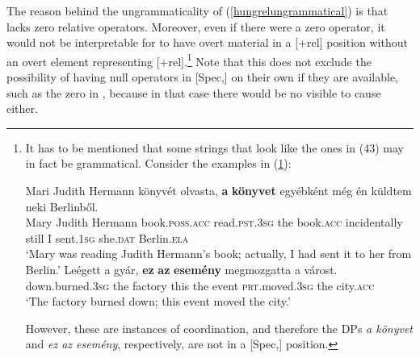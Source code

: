 The reason behind the ungrammaticality of (\ref{hungrelungrammatical}) is that  lacks zero relative operators. Moreover, even if there were a zero operator, it would not be interpretable for  to have overt material in a [+rel] position without an overt element representing [+rel].\footnote{It has to be mentioned that some strings that look like the ones in (43) may in fact be grammatical. Consider the examples in (\ref{zeroreloplexical4}):

\ea \label{zeroreloplexical4}
\ea \gll Mari	Judith Hermann	könyvét olvasta, \textbf{a} \textbf{könyvet} egyébként még én	küldtem	neki	Berlinből.\\
Mary Judith	Hermann	book.\textsc{poss.acc} read.\textsc{pst.3sg} the	book.\textsc{acc} incidentally still I sent.\textsc{1sg} she.\textsc{dat} Berlin.\textsc{ela}\\
\glt `Mary was reading Judith Hermann's book; actually, I had sent it to her from Berlin.'
\ex \gll Leégett	a	gyár,	\textbf{ez} \textbf{az} \textbf{esemény} megmozgatta	a	várost.\\
down.burned.\textsc{3sg} the factory this the event \textsc{prt}.moved.\textsc{3sg} the city.\textsc{acc}\\
\glt `The factory burned down; this event moved the city.'
\z
\z

However, these are instances of coordination, and therefore the DPs \textit{a könyvet} and \textit{ez az esemény}, respectively, are not in a [Spec,] position.} Note that this does not exclude the possibility of having null operators in [Spec,] on their own if they are available, such as the zero  in , because in that case there would be no visible  to cause  either.

